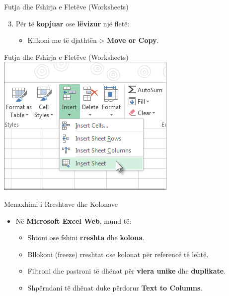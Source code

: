 \documentclass[
  ignorenonframetext,
]{beamer}
\providecommand{\tightlist}{%
  \setlength{\itemsep}{0pt}\setlength{\parskip}{0pt}}
\begin{document}
\begin{frame}{Futja dhe Fshirja e Fletëve (Worksheets)}
\label{futja-dhe-fshirja-e-fletuxebve-worksheets-2}
\begin{enumerate}
\setcounter{enumi}{2}
\item
  Për të \textbf{kopjuar} ose \textbf{lëvizur} një fletë:

  \begin{itemize}
  \tightlist
  \item
    Klikoni me të djathtën \textgreater{} \textbf{Move or Copy}.
  \end{itemize}
\end{enumerate}
\end{frame}

\begin{frame}{Futja dhe Fshirja e Fletëve (Worksheets)}
\label{futja-dhe-fshirja-e-fletuxebve-worksheets-3}
\includegraphics{./images/excel3.png}
\end{frame}

\begin{frame}{Menaxhimi i Rreshtave dhe Kolonave}
\label{menaxhimi-i-rreshtave-dhe-kolonave}
\begin{itemize}
\item
  Në \textbf{Microsoft Excel Web}, mund të:

  \begin{itemize}
  \item
    Shtoni ose fshini \textbf{rreshta} dhe \textbf{kolona}.
  \item
    Bllokoni (freeze) rreshtat ose kolonat për referencë të lehtë.
  \item
    Filtroni dhe pastroni të dhënat për \textbf{vlera unike} dhe
    \textbf{duplikate}.
  \item
    Shpërndani të dhënat duke përdorur \textbf{Text to Columns}.
  \end{itemize}
\end{itemize}
\end{frame}
\end{document}
